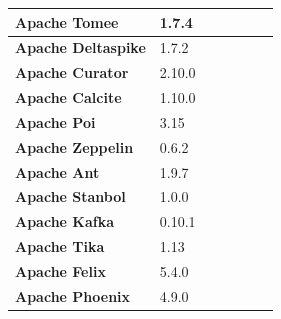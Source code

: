 \begin{landscape}
\begin{table}[htbp]
\begin{adjustbox}{width=1.3\textwidth}
\begin{tabular}{l|l|l|c|c|c|c}
			\textbf{Apache Tomee}      & 1.7.4            &                           &                           &                   &                        &  \\ \hline
			\textbf{Apache Deltaspike} & 1.7.2            &                           &                           &                   &                        &  \\ \hline
			\textbf{Apache Curator}    & 2.10.0           &                           &                           &                   &                        &  \\ \hline
			\textbf{Apache Calcite}    & 1.10.0           &                           &                           &                   &                        &  \\ \hline
			\textbf{Apache Poi}        & 3.15             &                           &                           &                   &                        &  \\ \hline
			\textbf{Apache Zeppelin}   & 0.6.2            &                           &                           &                   &                        &  \\ \hline
			\textbf{Apache Ant}        & 1.9.7            &                           &                           &                   &                        &  \\ \hline
			\textbf{Apache Stanbol}    & 1.0.0            &                           &                           &                   &                        &  \\ \hline
			\textbf{Apache Kafka}      & 0.10.1           &                           &                           &                   &                        &  \\ \hline
			\textbf{Apache Tika}       & 1.13             &                           &                           &                   &                        &  \\ \hline
			\textbf{Apache Felix}      & ‎5.4.0           &                           &                           &                   &                        &  \\ \hline
			\textbf{Apache Phoenix}    & 4.9.0            &                           &                           &                   &                        &  \\ \hline
		\end{tabular}
		\label{table:ch4_projects_statistics}

\end{adjustbox}

\end{table}

\end{landscape}



